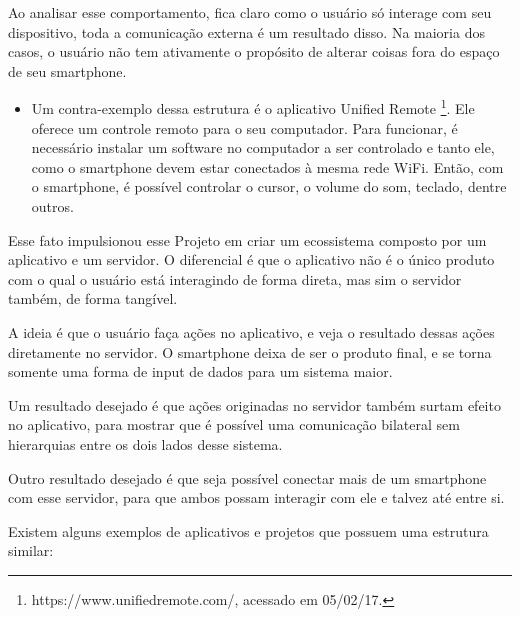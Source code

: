 \documentclass[a4paper,12pt]{article}
\begin{document}
Ao analisar esse comportamento, fica claro como o usuário só interage com seu dispositivo, toda a comunicação externa é um resultado disso. Na maioria dos casos, o usuário não tem ativamente o propósito de alterar coisas fora do espaço de seu smartphone.

\begin{itemize}

    \item Um contra-exemplo dessa estrutura é o aplicativo Unified Remote \footnote{https://www.unifiedremote.com/, acessado em 05/02/17.}. Ele oferece um controle remoto para o seu computador. Para funcionar, é necessário instalar um software no computador a ser controlado e tanto ele, como o smartphone devem estar conectados à mesma rede WiFi. Então, com o smartphone, é possível controlar o cursor, o volume do som, teclado, dentre outros.

\end{itemize}

Esse fato impulsionou esse Projeto em criar um ecossistema composto por um aplicativo e um servidor. O diferencial é que o aplicativo não é o único produto com o qual o usuário está interagindo de forma direta, mas sim o servidor também, de forma tangível.

A ideia é que o usuário faça ações no aplicativo, e veja o resultado dessas ações diretamente no servidor. O smartphone deixa de ser o produto final, e se torna somente uma forma de input de dados para um sistema maior.

Um resultado desejado é que ações originadas no servidor também surtam efeito no aplicativo, para mostrar que é possível uma comunicação bilateral sem hierarquias entre os dois lados desse sistema.

Outro resultado desejado é que seja possível conectar mais de um smartphone com esse servidor, para que ambos possam interagir com ele e talvez até entre si.


Existem alguns exemplos de aplicativos e projetos que possuem uma estrutura similar:
\end{document}
